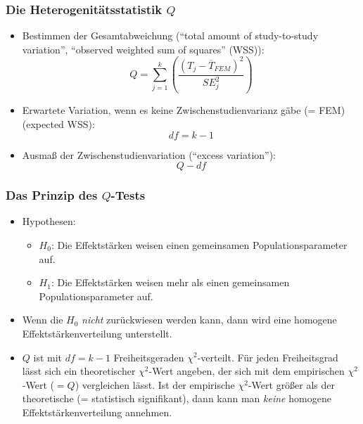 \begin{frame}
  \frametitle{Die Heterogenitätsstatistik $Q$}
  \begin{itemize}
  \item Bestimmen der Gesamtabweichung ("`total amount of study-to-study
    variation"', "`observed weighted sum of squares"' (WSS)):
    \begin{equation}
      Q = \sum\limits^k_{j = 1}\left(\frac{(T_j - \overline{T}_{FEM})^2}{SE_j^2}\right)
    \end{equation}
  \item Erwartete Variation, wenn es keine Zwischenstudienvarianz gäbe (= FEM) (expected WSS):
    \begin{equation}
      df = k-1
    \end{equation}
  \item Ausmaß der Zwischenstudienvariation ("`excess variation"'):
    \begin{equation}
      Q-df
    \end{equation}
  \end{itemize}
\end{frame}


\begin{frame}
  \frametitle{Das Prinzip des $Q$-Tests}
  \begin{itemize}
  \item<+-> Hypothesen:
    \begin{itemize}
    \item $H_0$: Die Effektstärken weisen einen gemeinsamen Populationsparameter auf.
    \item $H_1$: Die Effektstärken weisen mehr als einen gemeinsamen
      Populationsparameter auf.
    \end{itemize}
  \item<+-> Wenn die $H_0$ \emph{nicht} zurückwiesen werden kann, dann wird eine homogene
    Effektstärkenverteilung unterstellt.
  \item<+-> $Q$ ist mit $df = k-1$ Freiheitsgeraden $\chi^2$-verteilt. Für jeden
    Freiheitsgrad lässt sich ein theoretischer $\chi^2$-Wert angeben, der sich
    mit dem empirischen $\chi^2$-Wert ($=Q$) vergleichen lässt. Ist der
    empirische $\chi^2$-Wert größer als der theoretische (= statistisch
    signifikant), dann kann man \emph{keine} homogene Effektstärkenverteilung
    annehmen.
  \end{itemize}
\end{frame}


